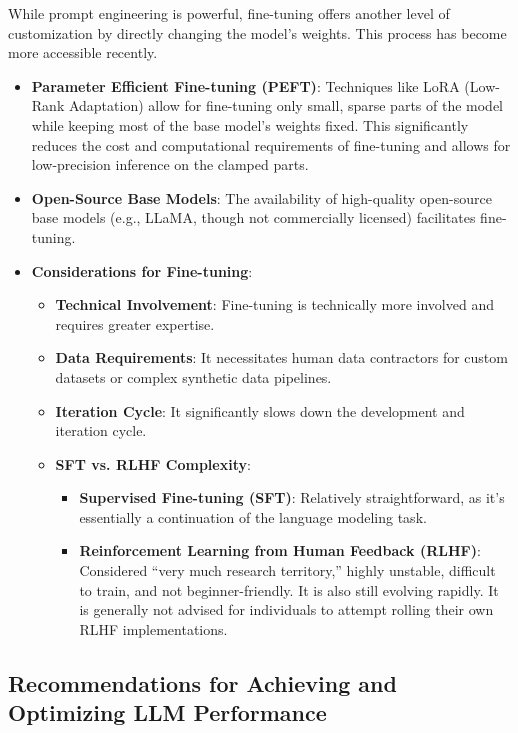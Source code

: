 While prompt engineering is powerful, fine-tuning offers another level of customization by directly changing the model's weights. This process has become more accessible recently.
\begin{itemize}
    \item \textbf{Parameter Efficient Fine-tuning (PEFT)}: Techniques like LoRA (Low-Rank Adaptation) allow for fine-tuning only small, sparse parts of the model while keeping most of the base model's weights fixed. This significantly reduces the cost and computational requirements of fine-tuning and allows for low-precision inference on the clamped parts.
    \item \textbf{Open-Source Base Models}: The availability of high-quality open-source base models (e.g., LLaMA, though not commercially licensed) facilitates fine-tuning.
    \item \textbf{Considerations for Fine-tuning}:
        \begin{itemize}
            \item \textbf{Technical Involvement}: Fine-tuning is technically more involved and requires greater expertise.
            \item \textbf{Data Requirements}: It necessitates human data contractors for custom datasets or complex synthetic data pipelines.
            \item \textbf{Iteration Cycle}: It significantly slows down the development and iteration cycle.
            \item \textbf{SFT vs. RLHF Complexity}:
                \begin{itemize}
                    \item \textbf{Supervised Fine-tuning (SFT)}: Relatively straightforward, as it's essentially a continuation of the language modeling task.
                    \item \textbf{Reinforcement Learning from Human Feedback (RLHF)}: Considered ``very much research territory,'' highly unstable, difficult to train, and not beginner-friendly. It is also still evolving rapidly. It is generally not advised for individuals to attempt rolling their own RLHF implementations.
                \end{itemize}
        \end{itemize}
\end{itemize}

\subsection{Recommendations for Achieving and Optimizing LLM Performance}


